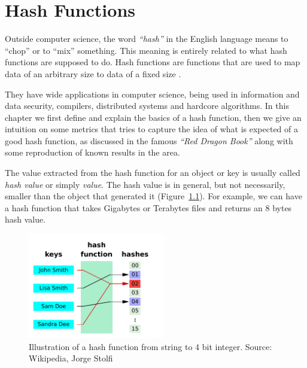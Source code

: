 \chapter{Hash Functions}
\label{cap:Hash Functions}


Outside computer science, the word \textit{``hash''} in the English language means to ``chop'' or to ``mix'' something. This meaning is entirely related to what hash functions are supposed to do. Hash functions are functions that are used to map data of an arbitrary size to data of a fixed size \citep{HashFuncWiki}.

They have wide applications in computer science, being used in information and data security, compilers, distributed systems and hardcore algorithms. In this chapter we first define and explain the basics of a hash function, then we give an intuition on some metrics that tries to capture the idea of what is expected of a good hash function, as discussed in the famous \textit{``Red Dragon Book''} \citep{DragonBook} along with some reproduction of known results in the area.

The value extracted from the hash function for an object or key is usually called \textit{hash value} or simply \textit{value}. The hash value is in general, but not necessarily, smaller than the object that generated it (Figure~\ref{fig:hashfunction}). For example, we can have a hash function that takes Gigabytes or Terabytes files and returns an 8 bytes hash value. 

\begin{figure}[h!]
  \centering
  \includegraphics[width=6cm]{figuras/hash-function.pdf}
  \caption{Illustration of a hash function from string to 4 bit integer. Source: Wikipedia, Jorge Stolfi }
  \label{fig:hashfunction}
\end{figure}

